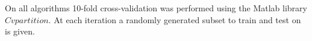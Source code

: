 On all algorithms 10-fold cross-validation was performed using the Matlab library $Cvpartition$. At each iteration a randomly generated subset to train and test on is given. 
